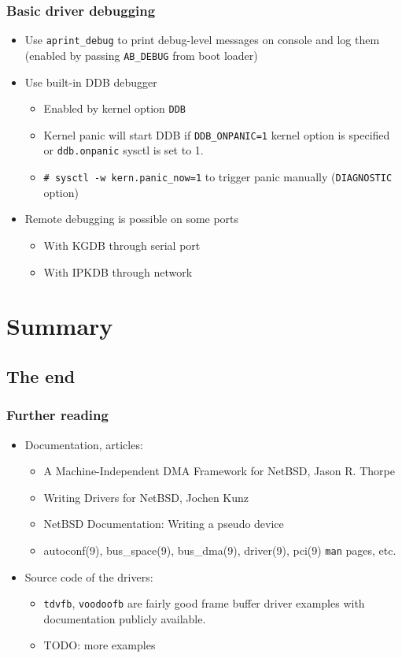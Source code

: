 \documentclass[dvipsnames,table]{beamer}
\begin{document}
\begin{frame}
\frametitle{Basic driver debugging} 
\begin{itemize}
	\item Use {\tt aprint\_debug} to print debug-level messages on console and log them (enabled by passing {\tt AB\_DEBUG} from boot loader)
	\item Use built-in DDB debugger
	\begin{itemize}
			\item Enabled by kernel option {\tt DDB}
			\item Kernel panic will start DDB if {\tt DDB\_ONPANIC=1} kernel option is specified or {\tt ddb.onpanic} sysctl is set to 1.
			\item {\tt \# sysctl -w kern.panic\_now=1} to trigger panic manually ({\tt DIAGNOSTIC} option)
	\end{itemize}	
	\item Remote debugging is possible on some ports
	\begin{itemize}
			\item With KGDB through serial port
			\item With IPKDB through network
	\end{itemize}	
\end{itemize}
\end{frame}

\section{Summary}
\subsection{The end}

\begin{frame}
\frametitle{Further reading}
\begin{itemize}
	\item Documentation, articles:
	\begin{itemize}
		\item A Machine-Independent DMA Framework for NetBSD, Jason R. Thorpe
		\item Writing Drivers for NetBSD, Jochen Kunz
		\item NetBSD Documentation: Writing a pseudo device
		\item autoconf(9), bus\_space(9), bus\_dma(9), driver(9), pci(9) {\tt man} pages, etc.
	\end{itemize}
	\item Source code of the drivers:
	\begin{itemize}
		\item {\tt tdvfb}, {\tt voodoofb} are fairly good frame buffer driver examples with documentation publicly available.
		\item TODO: more examples
	\end{itemize}
\end{itemize}

\end{frame}
\end{document}
